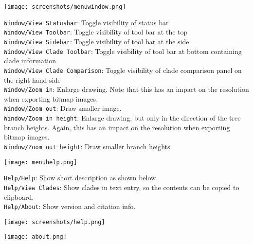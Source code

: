 \documentclass{article}
\begin{document}
\begin{center}
\texttt{[image: screenshots/menuwindow.png]}
\end{center}

\noindent
{\tt Window/View Statusbar}: Toggle visibility of status bar\\
{\tt Window/View Toolbar}: Toggle visibility of tool bar at the top\\
{\tt Window/View Sidebar}: Toggle visibility of tool bar at the side\\
{\tt Window/View Clade Toolbar}: Toggle visibility of tool bar at bottom containing clade information\\
{\tt Window/View Clade Comparison}: Toggle visibility of clade comparison panel on the right hand side\\
{\tt Window/Zoom in}: Enlarge drawing. Note that this has an impact on the resolution when
exporting bitmap images.\\
{\tt Window/Zoom out}: Draw smaller image.\\
{\tt Window/Zoom in height}: Enlarge drawing, but only in the direction of the tree branch heights. 
Again, this has an impact on the resolution when exporting bitmap images.\\
{\tt Window/Zoom out height}: Draw smaller branch heights.\\

\begin{center}
\texttt{[image: menuhelp.png]}
\end{center}

\noindent
{\tt Help/Help}: Show short description as shown below.\\
{\tt Help/View Clades}: Show clades in text entry, so the contents can be copied to clipboard.\\
{\tt Help/About}: Show version and citation info.

\begin{center}
\texttt{[image: screenshots/help.png]}
\end{center}

\begin{center}
\texttt{[image: about.png]}
\end{center}
\end{document}
